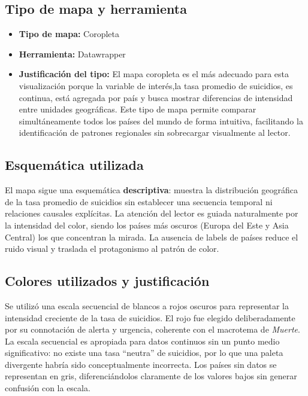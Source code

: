 \documentclass[12pt, letterpaper]{article}
\begin{document}
\subsection{Tipo de mapa y herramienta}

\begin{itemize}
  \item \textbf{Tipo de mapa:} Coropleta
  \item \textbf{Herramienta:} Datawrapper
  \item \textbf{Justificación del tipo:} El mapa coropleta es el más adecuado para
        esta visualización porque la variable de interés,la tasa promedio de
        suicidios, es continua, está agregada por país y busca mostrar diferencias
        de intensidad entre unidades geográficas. Este tipo de mapa permite comparar simultáneamente todos los países
        del mundo de forma intuitiva, facilitando la identificación de patrones
        regionales sin sobrecargar visualmente al lector.
\end{itemize}

\subsection{Esquemática utilizada}

El mapa sigue una esquemática \textbf{descriptiva}: muestra la distribución geográfica
de la tasa promedio de suicidios sin establecer una secuencia temporal ni relaciones
causales explícitas. La atención del lector es guiada naturalmente por la intensidad
del color, siendo los países más oscuros (Europa del Este y Asia Central) los que
concentran la mirada. La ausencia de labels de países reduce el ruido visual y
traslada el protagonismo al patrón de color.

\subsection{Colores utilizados y justificación}

Se utilizó una escala secuencial de blancos a rojos oscuros para representar la
intensidad creciente de la tasa de suicidios. El rojo fue elegido deliberadamente
por su connotación de alerta y urgencia, coherente con el macrotema de \textit{Muerte}.
La escala secuencial es apropiada para datos continuos sin un punto medio
significativo: no existe una tasa ``neutra'' de suicidios, por lo que una paleta
divergente habría sido conceptualmente incorrecta. Los países sin datos se
representan en gris, diferenciándolos claramente de los valores bajos sin generar
confusión con la escala.
\end{document}
